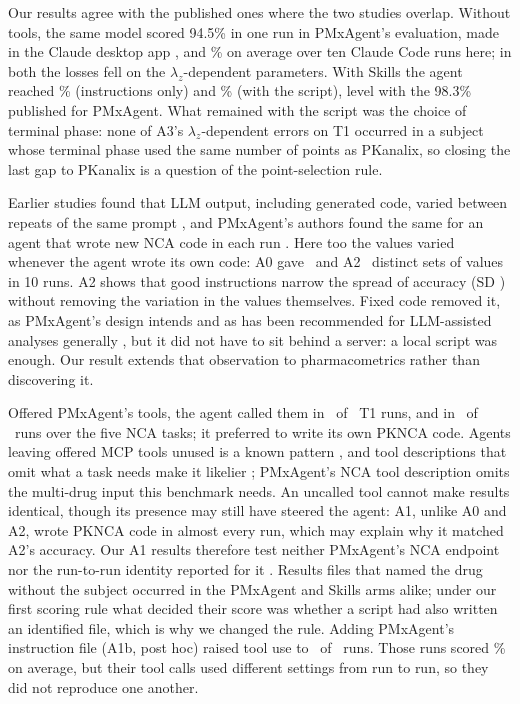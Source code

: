 \documentclass[11pt]{article}
\begin{document}
Our results agree with the published ones where the two studies overlap. Without tools, the same model scored 94.5\% in
one run in PMxAgent's evaluation, made in the Claude desktop app \cite{bloomingdale2026pmxagent}, and \numToneAzeroAcc\%
on average over ten Claude Code runs here; in both the losses fell on the $\lambda_z$-dependent parameters. With Skills
the agent reached \numToneAtwoAcc\% (instructions only) and \numToneAthreeAcc\% (with the script), level with the
98.3\% published for PMxAgent. What remained with the script was the choice of terminal phase: none of A3's
$\lambda_z$-dependent errors on T1 occurred in a subject whose terminal phase used the same number of points as
PKanalix, so closing the last gap to PKanalix is a question of the point-selection rule.

Earlier studies found that LLM output, including generated code, varied between repeats of the same prompt
\cite{shin2023chatgptpk,shin2024nonmem,kwack2026pkgpt}, and PMxAgent's authors found the same for an agent that wrote
new NCA code in each run \cite{bloomingdale2026pmxagent}. Here too the values varied whenever the agent wrote its own
code: A0 gave \numToneAzeroDistinct\ and A2 \numToneAtwoDistinct\ distinct sets of values in 10 runs. A2 shows that good
instructions narrow the spread of accuracy (SD \numToneAtwoAccSD) without removing the variation in the values
themselves. Fixed code removed it, as PMxAgent's design intends and as has been recommended for LLM-assisted analyses
generally \cite{dunn2026reproducible,adamidis2026tool}, but it did not have to sit behind a server: a local script was
enough. Our result extends that observation to pharmacometrics rather than discovering it.

Offered PMxAgent's tools, the agent called them in \numToneAonePmxRuns\ of \numToneAonePmxKnown\ T1 runs, and in
\numNcaAonePmxRuns\ of \numNcaAonePmxKnown\ runs over the five NCA tasks; it preferred to write its own PKNCA code.
Agents leaving offered MCP tools unused is a known pattern \cite{jia2025osworldmcp,alier2026scaffolding}, and tool
descriptions that omit what a task needs make it likelier \cite{hasan2026mcpsmells}; PMxAgent's NCA tool description
omits the multi-drug input this benchmark needs. An uncalled tool cannot make results identical, though its presence
may still have steered the agent: A1, unlike A0 and A2, wrote PKNCA code in almost every run, which may explain why it
matched A2's accuracy. Our A1 results therefore test neither PMxAgent's NCA endpoint nor the run-to-run identity reported
for it \cite{bloomingdale2026pmxagent}. Results files that named the drug without the subject occurred in the PMxAgent
and Skills arms alike; under our first scoring rule what decided their score was whether a script had also written an
identified file, which is why we changed the rule. Adding PMxAgent's instruction file (A1b, post hoc) raised tool use to
\numToneAonebPmxRuns\ of \numToneAonebPmxKnown\ runs. Those runs scored \numToneAonebAccPmxUsed\% on average, but their
tool calls used different settings from run to run, so they did not reproduce one another.
\end{document}
